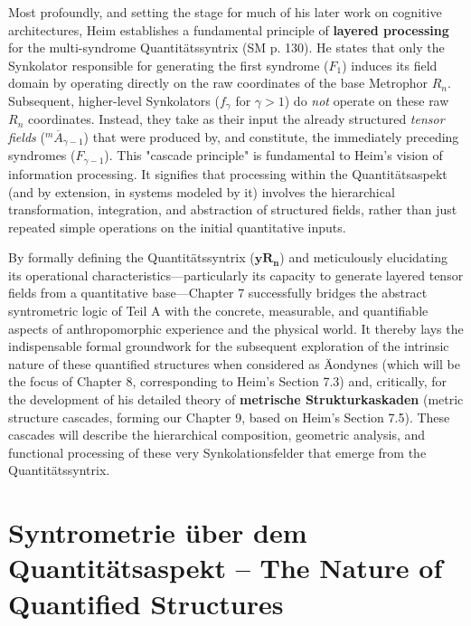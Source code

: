 \documentclass[12pt]{article}
\newcommand{\syndrom}{F}
\newcommand{\quantitaetssyntrix}{\bm{yR_n}}
\begin{document}
Most profoundly, and setting the stage for much of his later work on cognitive architectures, Heim establishes a fundamental principle of \textbf{layered processing} for the multi-syndrome Quantitätssyntrix (SM p. 130). He states that only the Synkolator responsible for generating the first syndrome (\( \syndrom_1 \)) induces its field domain by operating directly on the raw coordinates of the base Metrophor \( R_n \). Subsequent, higher-level Synkolators (\( f_\gamma \) for \( \gamma > 1 \)) do \textit{not} operate on these raw \( R_n \) coordinates. Instead, they take as their input the already structured \textit{tensor fields} (\( ^m\overline{A}_{\gamma-1} \)) that were produced by, and constitute, the immediately preceding syndromes (\( \syndrom_{\gamma-1} \)). This "cascade principle" is fundamental to Heim's vision of information processing. It signifies that processing within the Quantitätsaspekt (and by extension, in systems modeled by it) involves the hierarchical transformation, integration, and abstraction of structured fields, rather than just repeated simple operations on the initial quantitative inputs.

By formally defining the Quantitätssyntrix (\(\quantitaetssyntrix\)) and meticulously elucidating its operational characteristics—particularly its capacity to generate layered tensor fields from a quantitative base—Chapter 7 successfully bridges the abstract syntrometric logic of Teil A with the concrete, measurable, and quantifiable aspects of anthropomorphic experience and the physical world. It thereby lays the indispensable formal groundwork for the subsequent exploration of the intrinsic nature of these quantified structures when considered as Äondynes (which will be the focus of Chapter 8, corresponding to Heim's Section 7.3) and, critically, for the development of his detailed theory of \textbf{metrische Strukturkaskaden} (metric structure cascades, forming our Chapter 9, based on Heim's Section 7.5). These cascades will describe the hierarchical composition, geometric analysis, and functional processing of these very Synkolationsfelder that emerge from the Quantitätssyntrix.

\clearpage 
\section{Syntrometrie über dem Quantitätsaspekt – The Nature of Quantified Structures}
\label{sec:chapter8}
\end{document}
